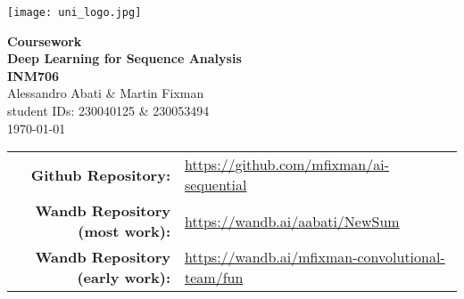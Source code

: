 \documentclass[a4paper, 11pt]{article}
\begin{document}
\begin{titlepage}
    \begin{minipage}{0.5\textwidth}
        \vspace{-2cm}
        \hspace{-1cm}
        \texttt{[image: uni\_logo.jpg]}
    \end{minipage}
    \begin{center}
        \vspace{6cm}
        \begin{minipage}{0.7\textwidth}
        \centering
        {\huge\bfseries Coursework \vspace{10pt}\\ Deep Learning for Sequence Analysis  \vspace{10pt} \\ INM706}\\[2ex]
        \vspace{15pt}
        {\LARGE Alessandro Abati \& Martin Fixman}\\[1ex]
        {\large student IDs: 230040125 \& 230053494}\\[1ex]
        {\Large \today}
        \end{minipage}
    \end{center}
	\vfill
    \begin{center}
		\small
		\begin{tabular}{r l}
			\textbf{Github Repository:} & \url{https://github.com/mfixman/ai-sequential} \\
			\textbf{Wandb Repository (most work):} & \url{https://wandb.ai/aabati/NewSum} \\
			\textbf{Wandb Repository (early work):} & \url{https://wandb.ai/mfixman-convolutional-team/fun}
		\end{tabular}
    \end{center}
\end{titlepage}

\clearpage{}
\thispagestyle{empty}
\tableofcontents

\clearpage{}
\setcounter{page}{1}


\clearpage{}


\clearpage{}




\clearpage{}


\clearpage{}


\clearpage{}


\clearpage{}

\begin{appendices}
	
\end{appendices}

\clearpage{}

\end{document}
